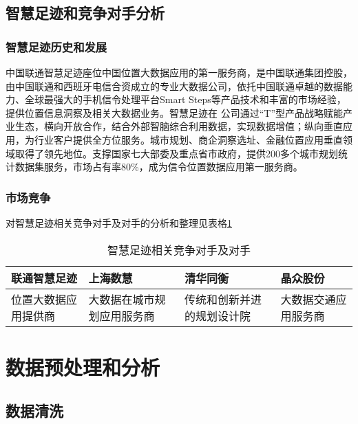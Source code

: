 \subsection{智慧足迹和竞争对手分析}
\subsubsection*{智慧足迹历史和发展}
中国联通智慧足迹座位中国位置大数据应用的第一服务商，是中国联通集团控股，由中国联通和西班牙电信合资成立的专业大数据公司，依托中国联通卓越的数据能力、全球最强大的手机信令处理平台Smart Steps等产品技术和丰富的市场经验，提供位置信息洞察及相关大数据业务。智慧足迹在
公司通过“T”型产品战略赋能产业生态，横向开放合作，结合外部智脑综合利用数据，实现数据增值；纵向垂直应用，为行业客户提供全方位服务。城市规划、商企洞察选址、金融位置应用垂直领域取得了领先地位。支撑国家七大部委及重点省市政府，提供200多个城市规划统计数据集服务，市场占有率80\%，成为信令位置数据应用第一服务商。
\subsubsection*{市场竞争}
对智慧足迹相关竞争对手及对手的分析和整理见表格\ref{table:1}
\begin{table}
\centering
\caption{智慧足迹相关竞争对手及对手}
\label{table:1}
\begin{tabular}{p{}|p{}|p{}|p{}}
\hline
\hline
联通智慧足迹 & 上海数慧 & 清华同衡 & 晶众股份\\
\hline
位置大数据应用提供商&大数据在城市规划应用服务商&传统和创新并进的规划设计院&大数据交通应用服务商\\
\hline
\hline
\end{tabular}
\end{table}
\section{数据预处理和分析}
\subsection{数据清洗}
